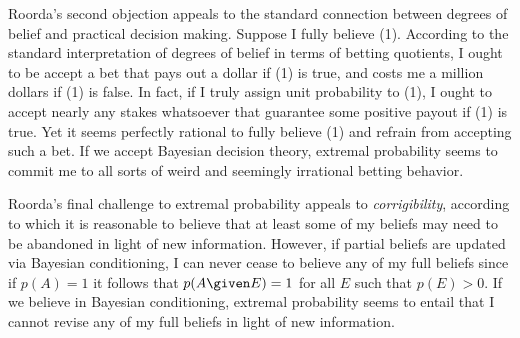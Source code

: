 Roorda's second objection appeals to the standard connection between degrees of
belief and practical decision making. Suppose I fully believe (1). According to
the standard interpretation of degrees of belief in terms of betting quotients,
I ought to be accept a bet that pays out a dollar if (1) is true, and costs me a
million dollars if (1) is false. In fact, if I truly assign unit probability to
(1), I ought to accept nearly any stakes whatsoever that guarantee some positive
payout if (1) is true. Yet it seems perfectly rational to fully believe (1) and
refrain from accepting such a bet. If we accept Bayesian decision theory,
extremal probability seems to commit me to all sorts of weird and seemingly
irrational betting behavior.

Roorda's final challenge to extremal probability appeals to {\em corrigibility},
according to which it is reasonable to believe that at least some of my beliefs
may need to be abandoned in light of new information. However, if partial
beliefs are updated via Bayesian conditioning, I can never cease to believe any
of my full beliefs since if $p(A)=1$ it follows that $p(A \given E)=1$ for all
$E$ such that $p(E)>0$. If we believe in Bayesian conditioning, extremal
probability seems to entail that I cannot revise any of my full beliefs in light
of new information.

